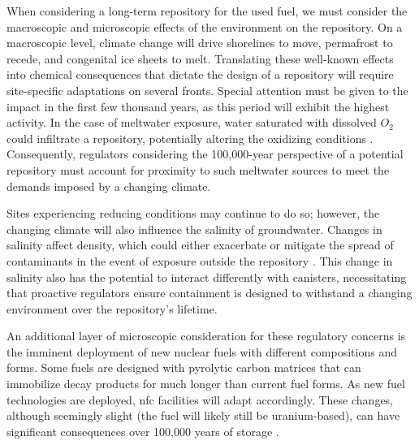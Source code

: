 When considering a long-term repository for the used fuel, we must consider the macroscopic and microscopic effects of the environment on the repository. On a macroscopic level, climate change will drive shorelines to move, permafrost to recede, and congenital ice sheets to melt. Translating these well-known effects into chemical consequences that dictate the design of a repository will require site-specific adaptations on several fronts. Special attention must be given to the impact in the first few thousand years, as this period will exhibit the highest activity. In the case of meltwater exposure, water saturated with dissolved $O_2$ could infiltrate a repository, potentially altering the oxidizing conditions \cite{gurban_hydrochemical_2001}. Consequently, regulators considering the 100,000-year perspective of a potential repository must account for proximity to such meltwater sources to meet the demands imposed by a changing climate.

Sites experiencing reducing conditions may continue to do so; however, the changing climate will also influence the salinity of groundwater. Changes in salinity affect density, which could either exacerbate or mitigate the spread of contaminants in the event of exposure outside the repository \cite{gurban_hydrochemical_2001}. This change in salinity also has the potential to interact differently with canisters, necessitating that proactive regulators ensure containment is designed to withstand a changing environment over the repository's lifetime.

An additional layer of microscopic consideration for these regulatory concerns
is the imminent deployment of new nuclear fuels with different compositions and
forms. Some fuels are designed with pyrolytic carbon matrices that can
immobilize decay products for much longer than current fuel forms. As new fuel
technologies are deployed, \gls{nfc} facilities will adapt accordingly. These changes, although seemingly slight (the fuel will likely still be uranium-based), can have significant consequences over 100,000 years
of storage \cite{hyland_post_closure_2013}.